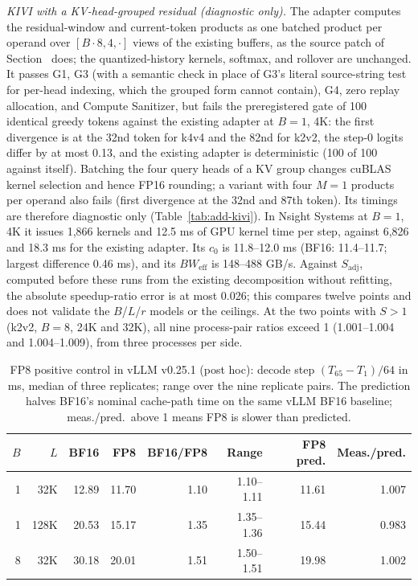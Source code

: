 \textit{KIVI with a KV-head-grouped residual (diagnostic only).}
The adapter computes the residual-window and current-token products as one batched product per operand over $[B \cdot 8, 4, \cdot]$ views of the existing buffers, as the source patch of Section~ does; the quantized-history kernels, softmax, and rollover are unchanged.
It passes G1, G3 (with a semantic check in place of G3's literal source-string test for per-head indexing, which the grouped form cannot contain), G4, zero replay allocation, and Compute Sanitizer, but fails the preregistered gate of 100 identical greedy tokens against the existing adapter at $B = 1$, 4K: the first divergence is at the 32nd token for k4v4 and the 82nd for k2v2, the step-0 logits differ by at most 0.13, and the existing adapter is deterministic (100 of 100 against itself).
Batching the four query heads of a KV group changes cuBLAS kernel selection and hence FP16 rounding; a variant with four $M = 1$ products per operand also fails (first divergence at the 32nd and 87th token).
Its timings are therefore diagnostic only (Table~\ref{tab:add-kivi}).
In Nsight Systems at $B = 1$, 4K it issues 1,866 kernels and 12.5 ms of GPU kernel time per step, against 6,826 and 18.3 ms for the existing adapter.
Its $c_0$ is 11.8--12.0 ms (BF16: 11.4--11.7; largest difference 0.46 ms), and its $BW_{\mathrm{eff}}$ is 148--488 GB/s.
Against $S_{\mathrm{adj}}$, computed before these runs from the existing decomposition without refitting, the absolute speedup-ratio error is at most 0.026; this compares twelve points and does not validate the $B$/$L$/$r$ models or the ceilings.
At the two points with $S > 1$ (k2v2, $B = 8$, 24K and 32K), all nine process-pair ratios exceed 1 (1.001--1.004 and 1.004--1.009), from three processes per side.

\begin{table}[t]
\caption{FP8 positive control in vLLM v0.25.1 (post hoc): decode step $(T_{65} - T_1)/64$ in ms, median of three replicates; range over the nine replicate pairs.
The prediction halves BF16's nominal cache-path time on the same vLLM BF16 baseline; meas./pred.\ above 1 means FP8 is slower than predicted.}
\label{tab:add-fp8}
\vskip 0.1in
\centering
\scriptsize
\setlength{\tabcolsep}{2.5pt}
\begin{tabular}{@{}rrrrrrrr@{}}
\toprule
$B$ & $L$ & BF16 & FP8 & BF16/FP8 & Range & FP8 pred. & Meas./pred. \\
\midrule
1 & 32K & 12.89 & 11.70 & 1.10 & 1.10--1.11 & 11.61 & 1.007 \\
1 & 128K & 20.53 & 15.17 & 1.35 & 1.35--1.36 & 15.44 & 0.983 \\
8 & 32K & 30.18 & 20.01 & 1.51 & 1.50--1.51 & 19.98 & 1.002 \\
\bottomrule
\end{tabular}
\end{table}

